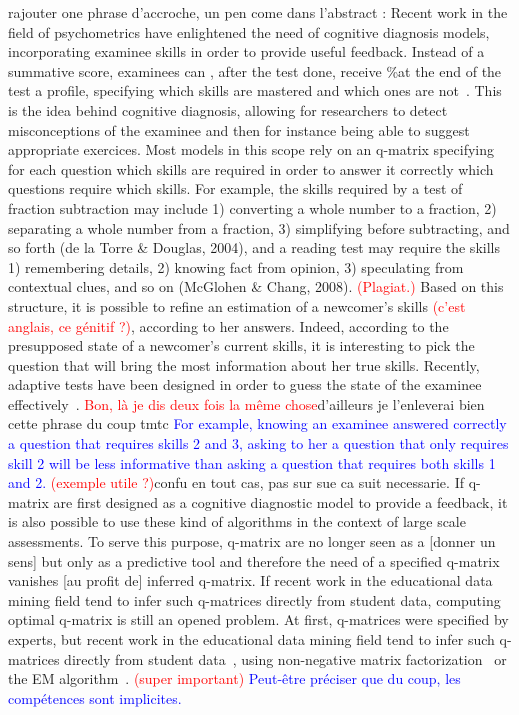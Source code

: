 \documentclass{sig-alternate}
\newcommand\alert[1]{\textcolor{red}{#1}}
\newcommand\note[1]{\textcolor{blue}{#1}}
\newcommand\jb[1]{\textcolor{green!50!black}{#1}}
\begin{document}
\jb{rajouter one phrase d'accroche, un pen come dans l'abstract : Recent work in the field of psychometrics have enlightened the need of cognitive diagnosis models, incorporating examinee skills in order to provide useful feedback. }Instead of a summative score, examinees can \jb{, after the test done,} receive \jb{\%at the end of the test} a profile, specifying which skills are mastered and which ones are not~\cite{Cheng2009}. This is the idea behind cognitive diagnosis, allowing for researchers to detect misconceptions of the examinee \jb{and then for instance being able to suggest appropriate exercices}. Most models in this scope rely on an q-matrix specifying \jb{for each question which skills are required in order to answer it correctly} which questions require which skills. For example, the skills required by a test of fraction subtraction may include 1) converting a whole number to a fraction, 2) separating a whole number from a fraction, 3) simplifying before subtracting, and so forth (de la Torre \& Douglas, 2004), and a reading test may require the skills 1) remembering details, 2) knowing fact from opinion, 3) speculating from contextual clues, and so on (McGlohen \& Chang, 2008). \alert{(Plagiat.)} Based on this structure, it is possible to refine an estimation of a newcomer's skills \alert{(c'est anglais, ce génitif ?)}, according to her answers. Indeed, according to the presupposed state of a newcomer's current skills, it is interesting to pick the question that will bring the most information about her true skills. Recently, adaptive tests have been designed in order to guess the state of the examinee effectively~\cite{Huebner2010}. \alert{Bon, là je dis deux fois la même chose}\jb{d'ailleurs je l'enleverai bien cette phrase du coup tmtc} \note{For example, knowing an examinee answered correctly a question that requires skills 2 and 3, asking to her a question that only requires skill 2 will be less informative than asking a question that requires both skills 1 and 2.} \alert{(exemple utile ?)}\jb{confu en tout cas, pas sur sue ca suit necessarie}. \jb{If q-matrix are first designed as a cognitive diagnostic model to provide a feedback, it is also possible to use these kind of algorithms in the context of large scale assessments. To serve this purpose, q-matrix are no longer seen as a [donner un sens] but only as a predictive tool and therefore the need of a specified q-matrix vanishes [au profit de] inferred q-matrix. If recent work in the educational data mining field tend to infer such q-matrices directly from student data, computing optimal q-matrix is still an opened problem. }At first, q-matrices were specified by experts, but recent work in the educational data mining field tend to infer such q-matrices directly from student data~\cite{Barnes2005}, using non-negative matrix factorization~\cite{Desmarais2011} or the EM algorithm~\cite{Huebner2010}. \alert{(super important)} \note{Peut-être préciser que du coup, les compétences sont implicites.}
\end{document}
